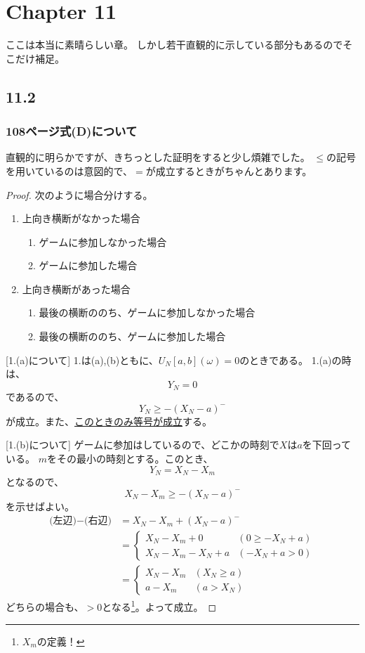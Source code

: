 \section{Chapter 11}
  ここは本当に素晴らしい章。
  しかし若干直観的に示している部分もあるのでそこだけ補足。
  \subsection{11.2}
    \subsubsection{108ページ式(D)について}
      直観的に明らかですが、きちっとした証明をすると少し煩雑でした。
      $\leq$の記号を用いているのは意図的で、$=$が成立するときがちゃんとあります。
      \begin{proof}
        次のように場合分けする。
        \begin{enumerate}
          \item 上向き横断がなかった場合
            \begin{enumerate}
              \item ゲームに参加しなかった場合
              \item ゲームに参加した場合
            \end{enumerate}
          \item 上向き横断があった場合
          \begin{enumerate}
            \item 最後の横断ののち、ゲームに参加しなかった場合
            \item 最後の横断ののち、ゲームに参加した場合
          \end{enumerate}
        \end{enumerate}

        [1.(a)について]
        1.は(a),(b)ともに、$U_N[a,b](\omega) = 0$のときである。
        1.(a)の時は、
        \[Y_N = 0\]
        であるので、
        \[Y_N \ge -(X_N - a)^-\]
        が成立。また、\underline{このときのみ等号が成立}する。

        [1.(b)について]
        ゲームに参加はしているので、どこかの時刻で$X$は$a$を下回っている。
        $m$をその最小の時刻とする。このとき、
        \[
          Y_N = X_N - X_m
        \]
        となるので、
        \[X_N - X_m \ge -(X_N - a)^-\]
        を示せばよい。
        \begin{align*}
          \text{(左辺)}-\text{(右辺)} &= X_N - X_m + (X_N - a)^-\\
          &= \begin{cases}
            X_N - X_m + 0 & (0 \ge -X_N + a)\\
            X_N - X_m - X_N + a & (-X_N + a > 0)
        \end{cases}\\
        &= \begin{cases}
          X_N - X_m  & (X_N \ge a) \\
          a - X_m  & (a > X_N)
        \end{cases}
        \end{align*}
        どちらの場合も、$>0$となる\footnote{$X_m$の定義！}。よって成立。


\end{proof}
